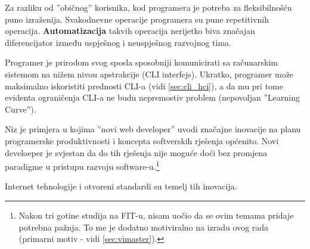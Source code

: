 \documentclass[times, utf8, seminar]{fit}
\begin{document}
Za razliku od ''običnog'' korisnika, kod programera je potreba za fleksibilnošću puno izraženija. Svakodnevne operacije programera su pune repetitivnih operacija. \textbf{Automatizacija} takvih operacija nerijetko biva značajan diferencijator između uspješnog i neuspješnog razvojnog tima.
 
Programer je prirodom svog sposla sposobniji komunicirati sa računarskim sistemom na nižem nivou apstrakcije (CLI interfejs). Ukratko, programer može maksimalno iskoristiti prednosti CLI-a (vidi \ref{sec:cli_hci}), a da mu pri tome evidenta ograničenja CLI-a ne budu nepremostiv problem (nepovoljan ''Learning Curve'').

Niz je primjera u kojima ''novi web developer'' uvodi značajne inovacije na planu programerske produktivnosti i koncepta softverskih rješenja općenito. Novi develoeper je svjestan da do tih rješenja nije moguće doći bez promjena paradigme u pristupu razvoju software-u.\footnote{Nakon tri gotine studija na FIT-u, nisam uočio da se ovim temama pridaje potrebna pažnja. To me je dodatno motiviralno na izradu ovog rada (primarni motiv - vidi \ref{sec:vimaster}).}

Internet tehnologije i otvoreni standardi su temelj tih inovacija.



\end{document}
